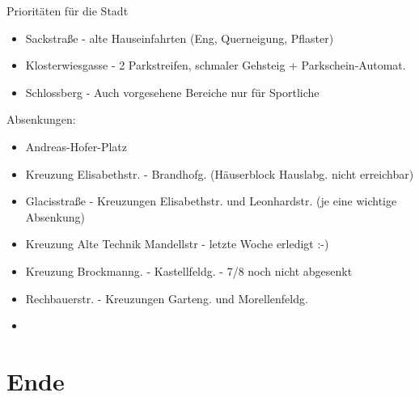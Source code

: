 \documentclass{beamer}
\begin{document}
\begin{frame}{Prioritäten für die Stadt}

      \begin{itemize}
        \item Sackstraße - alte Hauseinfahrten (Eng, Querneigung, Pflaster)
        \item Klosterwiesgasse - 2 Parkstreifen, schmaler Gehsteig + Parkschein-Automat.
        \item Schlossberg - Auch vorgesehene Bereiche nur für Sportliche
      \end{itemize}

      \pause

   Absenkungen:
      \begin{itemize}
        \item Andreas-Hofer-Platz
        \item Kreuzung Elisabethstr. - Brandhofg. (Häuserblock Hauslabg. nicht erreichbar)
        \item Glacisstraße - Kreuzungen Elisabethstr. und Leonhardstr. (je eine wichtige Absenkung)
        \item Kreuzung Alte Technik Mandellstr - letzte Woche erledigt :-)
        \item Kreuzung Brockmanng. - Kastellfeldg. - 7/8 noch nicht abgesenkt
        \item Rechbauerstr. - Kreuzungen Garteng. und Morellenfeldg.
      \end{itemize}

\end{frame}


\begin{frame}{}

\end{frame}


\begin{frame}{}

\end{frame}

\begin{frame}{}

    \begin{itemize}
      \item 
    \end{itemize}

\end{frame}

\section{Ende}
\end{document}
